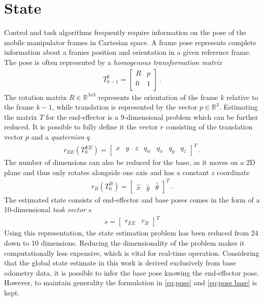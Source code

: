 \documentclass[times, utf8, diplomski, english]{fer}
\begin{document}
\section{State}\label{section:State}
Control and task algorithms frequently require information on the pose of the mobile manipulator frames in Cartesian space. 
A frame pose represents complete information about a frames position and orientation in a given reference frame.
The pose is often represented by a \textit{homogenous transformation matrix}
\begin{align}
T_{k-1}^k =
\begin{bmatrix}
R & p\\
0 & 1\\
\end{bmatrix}\,.
\label{transform}
\end{align}
The rotation matrix $R \in \mathbb{R}^{3x3}$ represents the orientation of the frame $k$ relative to the frame $k-1 $, while translation is represented by the vector $p \in \mathbb{R}^3$.
Estimating the matrix $T$ for the end-effector is a 9-dimensional problem which can be further reduced. 
It is possible to fully define it the vector $r$ consisting of the translation vector $p$ and a \textit{quaternion} $q$
\begin{align} \label{eq:pose}
r_{EE}\left(T_{0}^{EE}\right) = 
\begin{bmatrix}
x& y& z& q_w& q_x& q_y& q_z
\end{bmatrix}^T\, .
\end{align}
The number of dimensions can also be reduced for the base, as it moves on a 2D plane and thus only rotates alongside one axis and has a constant $z$ coordinate
\begin{align}\label{eq:pose base}
r_{B}\left(T_{0}^{B}\right) = 
\begin{bmatrix}
\hat{x}& \hat{y}& \hat{\theta}
\end{bmatrix}^T\, .
\end{align}
The estimated state consists of end-effector and base poses comes in the form of a 10-dimensional \textit{task vector} $s$
\begin{align}\label{eq:task_vector}
s = 
\begin{bmatrix}
r_{EE}& r_B
\end{bmatrix}^T
\end{align}
Using this representation, the state estimation problem has been reduced from 24 down to 10 dimensions.
Reducing the dimensionality of the problem makes it computationally less expensive, which is vital for real-time operation.
Considering that the global state estimate in this work is derived exclusively from base odometry data, it is possible to infer the base pose knowing the end-effector pose.
However, to maintain generality the formulation in \eqref{eq:pose} and \eqref{eq:pose base} is kept.
\end{document}

